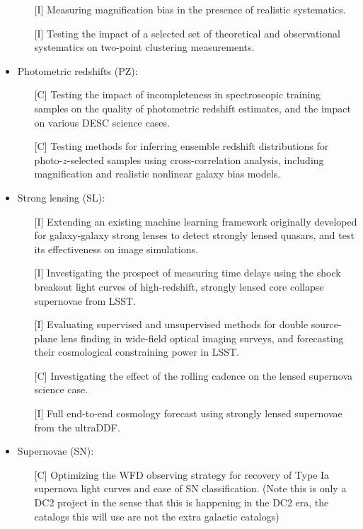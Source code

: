 \documentclass[preprint,times]{aastex61}
\begin{document}
\begin{itemize}
\begin{enumerate}
\item[{[I]}] Measuring magnification bias in the presence of realistic systematics.
\item[{[I]}] Testing the impact of a selected set of theoretical and observational systematics on two-point clustering measurements.
\end{enumerate}
\item Photometric redshifts (PZ):
\begin{enumerate}
\item[{[C]}] Testing the impact of incompleteness in spectroscopic training samples on the quality of photometric redshift estimates, and the impact on various DESC science cases.
\item[{[C]}] Testing methods for inferring ensemble redshift distributions for photo-$z$-selected samples using cross-correlation analysis, including magnification and realistic nonlinear galaxy bias models.
\end{enumerate}
\item Strong lensing (SL):
\begin{enumerate}
\item[{[I]}] Extending an existing machine learning framework originally developed for galaxy-galaxy strong lenses to detect strongly lensed quasars, and test its effectiveness on image simulations.
\item[{[I]}] Investigating the prospect of measuring time delays using the shock breakout light curves of  high-redshift, strongly lensed core collapse supernovae from LSST.
\item[{[I]}] Evaluating supervised and unsupervised methods for double source-plane lens finding in wide-field optical imaging surveys, and forecasting their cosmological constraining power in LSST.
\item[{[C]}] Investigating the effect of the rolling cadence on the lensed supernova science case.
\item[{[I]}]  Full end-to-end cosmology forecast using strongly lensed supernovae from the ultraDDF.
\end{enumerate}
\item Supernovae (SN):
\begin{enumerate}
\item[{[C]}] Optimizing the WFD observing strategy for recovery of Type Ia supernova light curves and ease of SN classification. (Note this is only a DC2 project in the sense that this is happening in the DC2 era, the catalogs this will use are not the extra galactic catalogs)

\end{enumerate}
\end{itemize}
\end{document}
